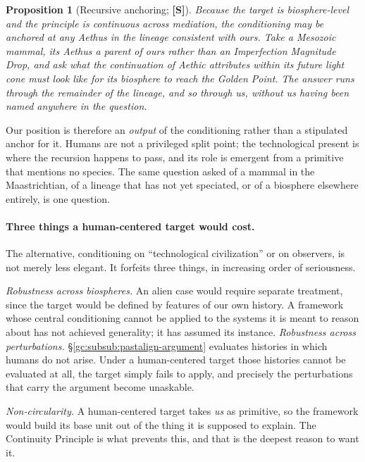 \documentclass[11pt]{article}
\numberwithin{equation}{section}
\theoremstyle{plain}
\newtheorem{proposition}[theorem]{Proposition}
\theoremstyle{definition}
\theoremstyle{remark}
\begin{document}
\begin{proposition}[Recursive anchoring; \textbf{[S]}]
\label{gc:prop:recursive}
Because the target is biosphere-level and the principle is continuous
across mediation, the conditioning may be anchored at \emph{any} Aethus
in the lineage consistent with ours. Take a Mesozoic mammal, its Aethus
a parent of ours rather than an Imperfection Magnitude Drop, and ask
what the continuation of Aethic attributes within \emph{its} future
light cone must look like for its biosphere to reach the Golden Point.
The answer runs through the remainder of the lineage, and so through
us, without us having been named anywhere in the question.
\end{proposition}

\noindent Our position is therefore an \emph{output} of the conditioning
rather than a stipulated anchor for it. Humans are not a privileged
split point; the technological present is where the recursion happens to
pass, and its role is emergent from a primitive that mentions no
species. The same question asked of a mammal in the Maastrichtian, of a
lineage that has not yet speciated, or of a biosphere elsewhere entirely,
is one question.

\paragraph{Three things a human-centered target would cost.}\label{gc:rem:privilegecost}
The alternative, conditioning on ``technological civilization'' or on
observers, is not merely less elegant. It forfeits three things, in
increasing order of seriousness.

\emph{Robustness across biospheres.} An alien case would require
separate treatment, since the target would be defined by features of our
own history. A framework whose central conditioning cannot be applied to
the systems it is meant to reason about has not achieved generality; it
has assumed its instance. \emph{Robustness across perturbations.} \S\ref{gc:subsub:pastalign-argument}
evaluates histories in which humans do not arise. Under a human-centered
target those histories cannot be evaluated at all, the target simply
fails to apply, and precisely the perturbations that carry the
argument become unaskable.

\emph{Non-circularity.} A human-centered target takes \emph{us} as
primitive, so the framework would build its base unit out of the thing
it is supposed to explain. The Continuity Principle is what prevents
this, and that is the deepest reason to want it.
\end{document}
